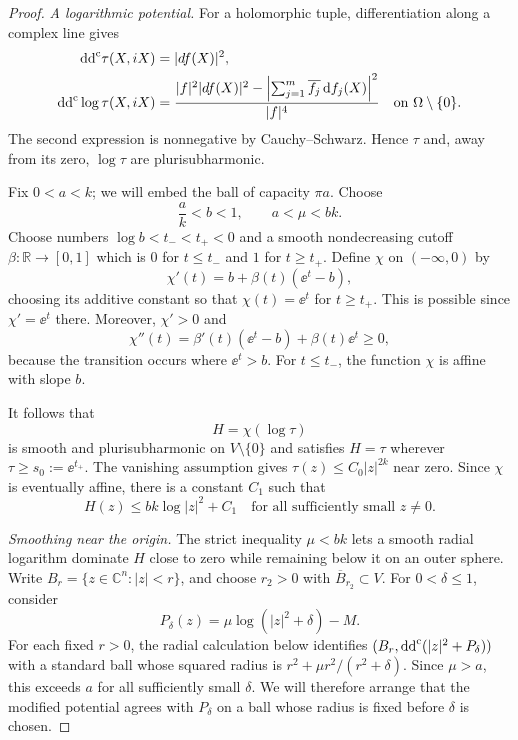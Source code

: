 \begin{proof}
\noindent\emph{A logarithmic potential.} For a holomorphic tuple, differentiation along a complex line gives
\begin{align}
 \mathrm{dd}^{\mathrm{c}}\tau(X,iX)&=|df(X)|^2,\notag\\
 \mathrm{dd}^{\mathrm{c}}\log\tau(X,iX)
 &=\frac{|f|^2|df(X)|^2
       -\left|\sum_{j=1}^m\overline{f_j}\,\mathrm{d} f_j(X)\right|^2}{|f|^4}
 \quad\text{on }\Omega\setminus\{0\}.
 \label{eq:ball-log-levi}
\end{align}
The second expression is nonnegative by Cauchy--Schwarz.  Hence $\tau$ and, away from its zero, $\log\tau$ are plurisubharmonic.

Fix $0<a<k$; we will embed the ball of capacity $\pi a$.  Choose
\[
 \frac ak<b<1,\qquad a<\mu<bk.
\]
Choose numbers $\log b<t_-<t_+<0$ and a smooth nondecreasing cutoff $\beta:\mathbb{R}\to[0,1]$ which is $0$ for $t\le t_-$ and $1$ for $t\ge t_+$. Define $\chi$ on $(-\infty,0)$ by
\[
 \chi'(t)=b+\beta(t)(\ee^t-b),
\]
choosing its additive constant so that $\chi(t)=\ee^t$ for $t\ge t_+$. This is possible since $\chi'=\ee^t$ there.  Moreover, $\chi'>0$ and
\[
 \chi''(t)=\beta'(t)(\ee^t-b)+\beta(t)\ee^t\ge0,
\]
because the transition occurs where $\ee^t>b$.  For $t\le t_-$, the function $\chi$ is affine with slope $b$.

It follows that
\[
 H=\chi(\log\tau)
\]
is smooth and plurisubharmonic on $V\setminus\{0\}$ and satisfies $H=\tau$ wherever $\tau\ge s_0:=\ee^{t_+}$.  The vanishing assumption gives $\tau(z)\le C_0|z|^{2k}$ near zero.  Since $\chi$ is eventually affine, there is a constant $C_1$ such that
\begin{equation}
 H(z)\le bk\log|z|^2+C_1
 \quad\text{for all sufficiently small }z\ne0.
 \label{eq:ball-singularity}
\end{equation}

\smallskip
\noindent\emph{Smoothing near the origin.} The strict inequality $\mu<bk$ lets a smooth radial logarithm dominate $H$ close to zero while remaining below it on an outer sphere. Write $B_r=\{z\in\mathbb{C}^n:|z|<r\}$, and choose $r_2>0$ with $\overline{B}_{r_2}\subset V$.  For $0<\delta\le1$, consider
\[
 P_\delta(z)=\mu\log(|z|^2+\delta)-M.
\]
For each fixed $r>0$, the radial calculation below identifies $(B_r,\mathrm{dd}^{\mathrm{c}}(|z|^2+P_\delta))$ with a standard ball whose squared radius is $r^2+\mu r^2/(r^2+\delta)$. Since $\mu>a$, this exceeds $a$ for all sufficiently small $\delta$. We will therefore arrange that the modified potential agrees with $P_\delta$ on a ball whose radius is fixed before $\delta$ is chosen.


\end{proof}
